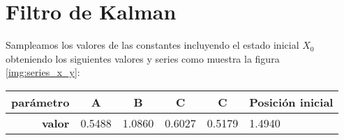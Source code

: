 \documentclass[letterpaper,11pt,oneside]{article}
\begin{document}
\fi

\section{Filtro de Kalman}

\iffalse 
Primero consideremos $f$ como $ f(X_n) = A X_{n-1} + B V_n$ y $h$ como $ h_n(X_n) = C X_n + DW_n$, lo cual corresponde a un modelo lineal, pues $A,B,C,D$ son constantes. Además tanto $V$ como $W$ son sucesiones de ruido Gaussiano $\mathcal{N}(0,1)$. Consideramos estos datos como input para nuestro modelo, que evolucionará en dos etapas:
\begin{enumerate}
    \item \textbf{Predicción}: primeramente se computan las predicciones a priori tanto de $X_n$ como de la varianza, que denotamos $P_n$.
    $$ \hat X_{n|n-1} = A \hat X_{n-1},\hspace{.5cm} P_{n|n-1} = A^2 P_{n-1|n-1} + Q$$
    donde $Q$ es la varianza del ruido en la ecuación de estado. Notemos que en este caso, esto es igual a $B$, pues hemos definido ruidos normales estándar.
    \item \textbf{Actualización}: una vez que la medición se vuelve disponible, podemos incorporarla en nuestra estimación. Esto se hace usando un valor que llamaremos la ganancia de Kalman. Este parámetro nos dice cuanto priorizar la medición versus nuestro estimado usando la confianza en las mediciones, y estará dada por:
    $$ K_n = \frac{P_{n|n-1}}{(P_{n|n-1}+\sigma^2)},\hspace{.5cm} \hat X_{n|n}=\hat X_{n|n-1}+K_n(Y_n-AX_{n|n-1}),\hspace{.5cm} P_{n|n}=(1-K_n)P_{n|n-1}$$
\end{enumerate}

\fi

Sampleamos los valores de las constantes incluyendo el estado inicial $X_0$ obteniendo los siguientes valores y series como muestra la figura \ref{img:series_x_y}:

\begin{table}
\begin{tabular}{|c|c|c|l|l|l|}
\hline
\textbf{parámetro}                   & \textbf{A}                  & \textbf{B}                  & \multicolumn{1}{c|}{\textbf{C}} & \multicolumn{1}{c|}{\textbf{C}} & \multicolumn{1}{c|}{\textbf{Posición inicial}} \\ \hline
\multicolumn{1}{|r|}{\textbf{valor}} & \multicolumn{1}{r|}{0.5488} & \multicolumn{1}{r|}{1.0860} & 0.6027                          & 0.5179                          & 1.4940                                         \\ \hline
\end{tabular}
\end{table}
\end{document}
